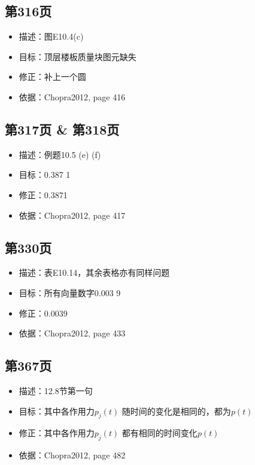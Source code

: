\documentclass[11pt]{article}
\begin{document}
\subsection*{第316页}
\label{sec:orgdcd8b2c}

\begin{itemize}
\item 描述：图E10.4(c)
\item 目标：顶层楼板质量块图元缺失
\item 修正：补上一个圆
\item 依据：Chopra2012, page 416
\end{itemize}

\subsection*{第317页 \& 第318页}
\label{sec:org58d23f9}

\begin{itemize}
\item 描述：例题10.5 (e) (f)
\item 目标：0.387 1
\item 修正：0.3871
\item 依据：Chopra2012, page 417
\end{itemize}

\subsection*{第330页}
\label{sec:org688013d}

\begin{itemize}
\item 描述：表E10.14，其余表格亦有同样问题
\item 目标：所有向量数字0.003 9
\item 修正：0.0039
\item 依据：Chopra2012, page 433
\end{itemize}

\subsection*{第367页}
\label{sec:org0d0e01d}

\begin{itemize}
\item 描述：12.8节第一句
\item 目标：其中各作用力\(p_{j}(t)\) 随时间的变化是相同的，都为\(p(t)\)
\item 修正：其中各作用力\(p_{j}(t)\) 都有相同的时间变化\(p(t)\)
\item 依据：Chopra2012, page 482
\end{itemize}
\end{document}
